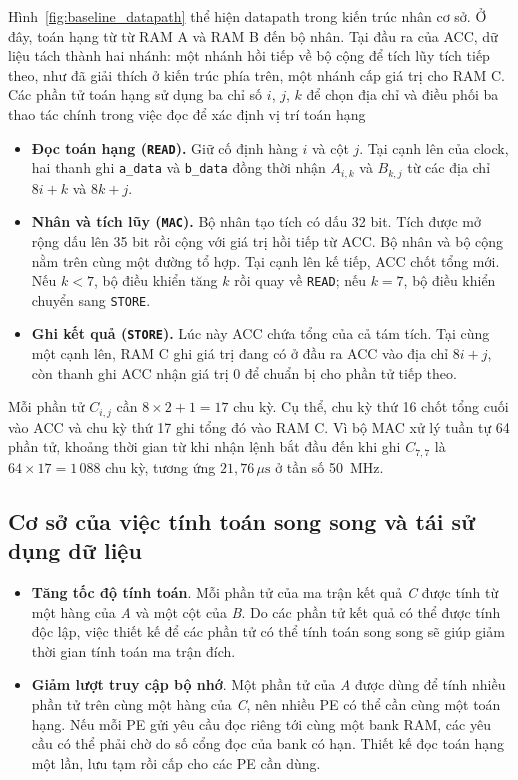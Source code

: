 Hình~\ref{fig:baseline_datapath} thể hiện datapath trong kiến trúc nhân cơ sở. Ở đây, toán hạng từ 
từ RAM A và RAM B đến bộ nhân. Tại đầu ra của ACC, dữ liệu tách thành hai nhánh: một nhánh hồi tiếp về bộ cộng để tích lũy tích tiếp theo, như đã giải thích ở kiến trúc phía trên, một nhánh cấp giá trị cho RAM C. Các phần tử toán hạng sử dụng ba chỉ số $i$, $j$, $k$ để chọn địa chỉ và điều phối ba thao tác chính trong việc đọc để xác định vị trí toán hạng

\begin{itemize}
    \item \textbf{Đọc toán hạng (\texttt{READ}).}
    Giữ cố định hàng $i$ và cột $j$. Tại cạnh lên của clock,
    hai thanh ghi \texttt{a\_data} và \texttt{b\_data} đồng thời
    nhận $A_{i,k}$ và $B_{k,j}$ từ các địa chỉ $8i+k$ và $8k+j$.

    \item \textbf{Nhân và tích lũy (\texttt{MAC}).}
    Bộ nhân tạo tích có dấu 32 bit. Tích được mở rộng dấu lên 35 bit
    rồi cộng với giá trị hồi tiếp từ ACC. Bộ nhân và bộ cộng nằm trên
    cùng một đường tổ hợp. Tại cạnh lên kế tiếp, ACC chốt tổng mới.
    Nếu $k<7$, bộ điều khiển tăng $k$ rồi quay về \texttt{READ};
    nếu $k=7$, bộ điều khiển chuyển sang \texttt{STORE}.

    \item \textbf{Ghi kết quả (\texttt{STORE}).}
    Lúc này ACC chứa tổng của cả tám tích. Tại cùng một cạnh lên,
    RAM C ghi giá trị đang có ở đầu ra ACC vào địa chỉ $8i+j$,
    còn thanh ghi ACC nhận giá trị 0 để chuẩn bị cho phần tử tiếp theo.
\end{itemize}

Mỗi phần tử $C_{i,j}$ cần $8\times2+1=17$ chu kỳ. Cụ thể, chu kỳ
thứ 16 chốt tổng cuối vào ACC và chu kỳ thứ 17 ghi tổng đó vào RAM C.
Vì bộ MAC xử lý tuần tự 64 phần tử, khoảng thời gian từ khi nhận
lệnh bắt đầu đến khi ghi $C_{7,7}$ là $64\times17=1\,088$ chu kỳ,
tương ứng $21{,}76\,\mu\mathrm{s}$ ở tần số 50~MHz.

\subsection{Cơ sở của việc tính toán song song và tái sử dụng dữ liệu}

\begin{itemize}
    \item \textbf{Tăng tốc độ tính toán}. Mỗi phần tử của ma trận kết quả \textit{C} được tính từ một hàng của \textit{A} và một cột của \textit{B}. Do các phần tử kết quả có thể được tính độc lập, việc thiết kế để các phần tử có thể tính toán song song sẽ giúp giảm thời gian tính toán ma trận đích.
    \item \textbf{Giảm lượt truy cập bộ nhớ}. Một phần tử của \textit{A} được dùng để tính nhiều phần tử trên cùng một hàng của \textit{C}, nên nhiều PE có thể cần cùng một toán hạng. Nếu mỗi PE gửi yêu cầu đọc riêng tới cùng một bank RAM, các yêu cầu có thể phải chờ do số cổng đọc của bank có hạn. Thiết kế đọc toán hạng một lần, lưu tạm rồi cấp cho các PE cần dùng.
\end{itemize}

